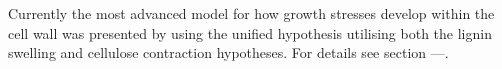 Currently the most advanced model for how growth stresses develop within the
cell wall was presented by \citet{Alm_ras_2005} using the unified hypothesis
\citep{okuyama1986,Okuyama_1994,yamamoto1991,ISI:A1992HP18200001,Yamamoto_1998} utilising both the lignin swelling and
cellulose contraction hypotheses. For details see section ---.
